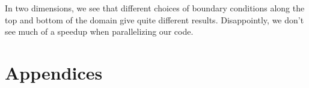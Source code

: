 \documentclass[10pt,a4paper]{article}
\begin{document}
In two dimensions, we see that different choices of boundary conditions along the top and bottom of the domain give quite different results. Disappointly, we don't see much of a speedup when parallelizing our code.



{}

\newpage
\appendix
\section*{\Huge{Appendices}}



%
\end{document}
